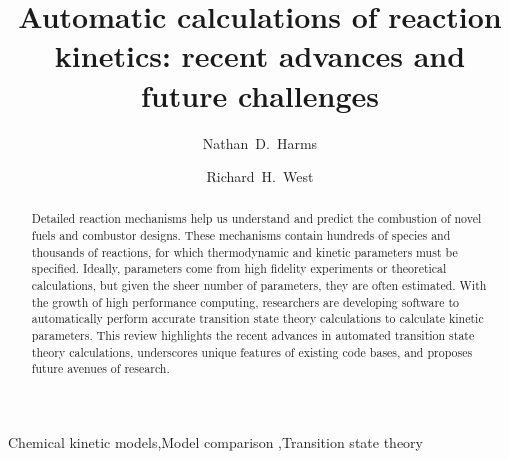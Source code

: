 \documentclass[preprint, 11pt]{elsarticle} %
\begin{document}
\begin{frontmatter}

\title{Automatic calculations of reaction kinetics: recent advances and future challenges}

\author[neu]{Nathan~D.~Harms}
\author[neu]{Richard~H.~West}%

\address[neu]{Department of Chemical Engineering\\
Northeastern University, Boston, MA 02115, USA}


\begin{abstract}

Detailed reaction mechanisms help us understand and predict the combustion of novel fuels and combustor designs.
These mechanisms contain hundreds of species and thousands of reactions, for which thermodynamic and kinetic parameters must be specified.
Ideally, parameters come from high fidelity experiments or theoretical calculations, but given the sheer number of parameters, they are often estimated.
With the growth of high performance computing, researchers are developing software to automatically perform accurate transition state theory calculations to calculate kinetic parameters. 
This review highlights the recent advances in automated transition state theory calculations, underscores unique features of existing code bases, and proposes future avenues of research.

\end{abstract}


\begin{keyword}
    Chemical kinetic models\sep Model comparison \sep Transition state theory
\end{keyword}

\end{frontmatter}


\end{document}
